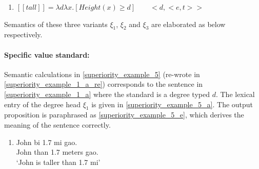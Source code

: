 \documentclass{ctexart}
\begin{document}
\begin{enumerate}
    \item \label{tallLE_re_re}
    $[\![tall]\!]=\lambda d \lambda x.[Height(x) \geq d] \qquad <d,<e,t>>$
\end{enumerate}

Semantics of these three variants $\xi_1$, $\xi_2$ and $\xi_3$ are elaborated as below respectively.

\paragraph{Specific value standard:}

Semantic calculations in \ref{superiority_example_5} (re-wrote in \ref{superiority_example_1_a_re}) corresponds to the sentence in \ref{superiority_example_1_a} where the standard is a degree typed $d$. The lexical entry of the degree head $\xi_1$ is given in \ref{superiority_example_5_a}. The output proposition is paraphrased as \ref{superiority_example_5_e}, which derives the meaning of the sentence correctly.

\begin{enumerate}
    \item \label{superiority_example_1_a_re}
    John bi 1.7 mi gao. \\
    John than 1.7 meters gao. \\
    `John is taller than 1.7 mi' 
\end{enumerate}
\end{document}

